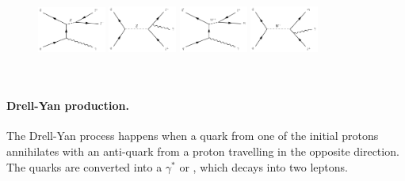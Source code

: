 \begin{figure}[h!]
\centering
  \includegraphics[width=0.2\textwidth]{Figures/c4/dia/40000101.pdf}
  \includegraphics[width=0.2\textwidth]{Figures/c4/dia/40000104.pdf}
  \includegraphics[width=0.2\textwidth]{Figures/c4/dia/40000111.pdf}
  \includegraphics[width=0.2\textwidth]{Figures/c4/dia/40000114.pdf}
  \caption{~\cite{diagram}}
  \label{fig:c43}
\end{figure}

\paragraph{Drell-Yan production.}\label{sec:c4dy}
The Drell-Yan process happens when a quark from one of the initial
protons annihilates with an anti-quark from a proton travelling in the
opposite direction. The quarks are converted into a $\gamma^{*}$ or
\PZ, which decays into two leptons.


